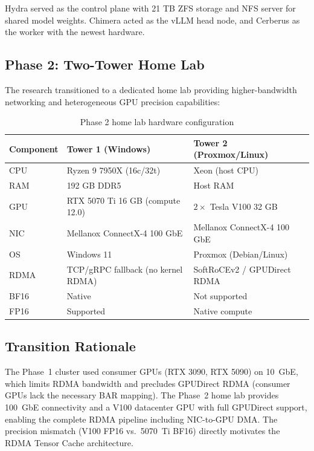 \documentclass[11pt,letterpaper]{article}
\theoremstyle{definition}
\begin{document}
Hydra served as the control plane with 21 TB ZFS storage and NFS server for shared model weights. Chimera acted as the vLLM head node, and Cerberus as the worker with the newest hardware.

\subsection{Phase 2: Two-Tower Home Lab}

The research transitioned to a dedicated home lab providing higher-bandwidth networking and heterogeneous GPU precision capabilities:

\begin{table}[htbp]
\centering
\caption{Phase 2 home lab hardware configuration}
\label{tab:phase2-hardware}
\begin{tabular}{@{}lll@{}}
\toprule
\textbf{Component} & \textbf{Tower 1 (Windows)} & \textbf{Tower 2 (Proxmox/Linux)} \\
\midrule
CPU & Ryzen 9 7950X (16c/32t) & Xeon (host CPU) \\
RAM & 192 GB DDR5 & Host RAM \\
GPU & RTX 5070 Ti 16 GB (compute 12.0) & $2\times$ Tesla V100 32 GB \\
NIC & Mellanox ConnectX-4 100 GbE & Mellanox ConnectX-4 100 GbE \\
OS & Windows 11 & Proxmox (Debian/Linux) \\
RDMA & TCP/gRPC fallback (no kernel RDMA) & SoftRoCEv2 / GPUDirect RDMA \\
BF16 & Native & Not supported \\
FP16 & Supported & Native compute \\
\bottomrule
\end{tabular}
\end{table}

\subsection{Transition Rationale}

The Phase~1 cluster used consumer GPUs (RTX 3090, RTX 5090) on 10~GbE, which limits RDMA bandwidth and precludes GPUDirect RDMA (consumer GPUs lack the necessary BAR mapping). The Phase~2 home lab provides 100~GbE connectivity and a V100 datacenter GPU with full GPUDirect support, enabling the complete RDMA pipeline including NIC-to-GPU DMA. The precision mismatch (V100 FP16 vs.\ 5070~Ti BF16) directly motivates the RDMA Tensor Cache architecture.
\end{document}
